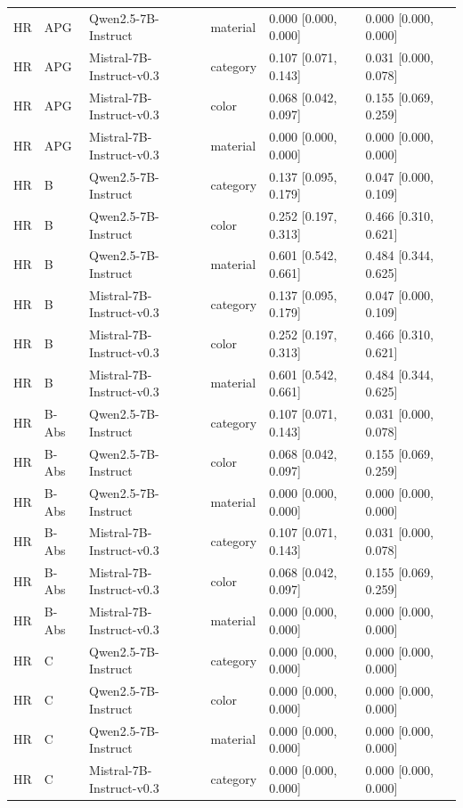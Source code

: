 \begin{tabular}{llllll}
HR & APG & Qwen2.5-7B-Instruct & material & 0.000 [0.000, 0.000] & 0.000 [0.000, 0.000] \\
HR & APG & Mistral-7B-Instruct-v0.3 & category & 0.107 [0.071, 0.143] & 0.031 [0.000, 0.078] \\
HR & APG & Mistral-7B-Instruct-v0.3 & color & 0.068 [0.042, 0.097] & 0.155 [0.069, 0.259] \\
HR & APG & Mistral-7B-Instruct-v0.3 & material & 0.000 [0.000, 0.000] & 0.000 [0.000, 0.000] \\
HR & B & Qwen2.5-7B-Instruct & category & 0.137 [0.095, 0.179] & 0.047 [0.000, 0.109] \\
HR & B & Qwen2.5-7B-Instruct & color & 0.252 [0.197, 0.313] & 0.466 [0.310, 0.621] \\
HR & B & Qwen2.5-7B-Instruct & material & 0.601 [0.542, 0.661] & 0.484 [0.344, 0.625] \\
HR & B & Mistral-7B-Instruct-v0.3 & category & 0.137 [0.095, 0.179] & 0.047 [0.000, 0.109] \\
HR & B & Mistral-7B-Instruct-v0.3 & color & 0.252 [0.197, 0.313] & 0.466 [0.310, 0.621] \\
HR & B & Mistral-7B-Instruct-v0.3 & material & 0.601 [0.542, 0.661] & 0.484 [0.344, 0.625] \\
HR & B-Abs & Qwen2.5-7B-Instruct & category & 0.107 [0.071, 0.143] & 0.031 [0.000, 0.078] \\
HR & B-Abs & Qwen2.5-7B-Instruct & color & 0.068 [0.042, 0.097] & 0.155 [0.069, 0.259] \\
HR & B-Abs & Qwen2.5-7B-Instruct & material & 0.000 [0.000, 0.000] & 0.000 [0.000, 0.000] \\
HR & B-Abs & Mistral-7B-Instruct-v0.3 & category & 0.107 [0.071, 0.143] & 0.031 [0.000, 0.078] \\
HR & B-Abs & Mistral-7B-Instruct-v0.3 & color & 0.068 [0.042, 0.097] & 0.155 [0.069, 0.259] \\
HR & B-Abs & Mistral-7B-Instruct-v0.3 & material & 0.000 [0.000, 0.000] & 0.000 [0.000, 0.000] \\
HR & C & Qwen2.5-7B-Instruct & category & 0.000 [0.000, 0.000] & 0.000 [0.000, 0.000] \\
HR & C & Qwen2.5-7B-Instruct & color & 0.000 [0.000, 0.000] & 0.000 [0.000, 0.000] \\
HR & C & Qwen2.5-7B-Instruct & material & 0.000 [0.000, 0.000] & 0.000 [0.000, 0.000] \\
HR & C & Mistral-7B-Instruct-v0.3 & category & 0.000 [0.000, 0.000] & 0.000 [0.000, 0.000] \\

\end{tabular}
